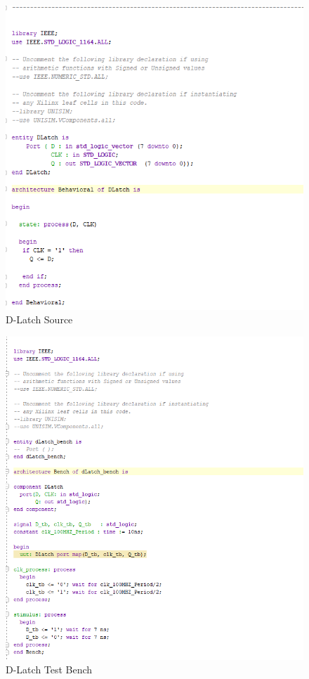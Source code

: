 \documentclass{article}
\begin{document}
\begin{figure}[h]
\begin{center}
\includegraphics[width=1\textwidth]{DLatchSource.png} %
\caption{D-Latch Source}
\end{center}
\end{figure}

\begin{figure}[h]
\begin{center}
\includegraphics[width=1\textwidth]{DLatchSimSource.png} %
\caption{D-Latch Test Bench}
\end{center}
\end{figure}
\end{document}
